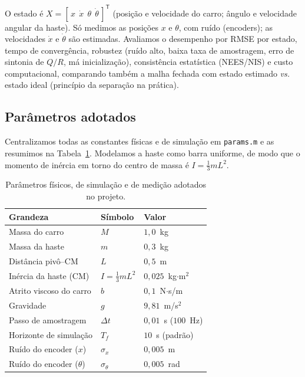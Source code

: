 \documentclass[brazil, 12pt]{article}
\begin{document}
O estado é
$X = [\,x\ \ \dot{x}\ \ \theta\ \ \dot{\theta}\,]^{\mathsf T}$ (posição e
velocidade do carro; ângulo e velocidade angular da haste). Só medimos as
posições $x$ e $\theta$, com ruído (encoders); as velocidades $\dot{x}$ e
$\dot{\theta}$ são estimadas. Avaliamos o desempenho por RMSE por estado, tempo
de convergência, robustez (ruído alto, baixa taxa de amostragem, erro de
sintonia de $Q/R$, má inicialização), consistência estatística (NEES/NIS) e
custo computacional, comparando também a malha fechada com estado estimado
\emph{vs.} estado ideal (princípio da separação na prática).

\subsection{Parâmetros adotados}

Centralizamos todas as constantes físicas e de simulação em \texttt{params.m}
e as resumimos na Tabela~\ref{tab:params}. Modelamos a haste como barra
uniforme, de modo que o momento de inércia em torno do centro de massa é
$I = \tfrac{1}{3}mL^{2}$.

\begin{table}[H]
\centering
\begin{tabular}{l l l}
\hline
\textbf{Grandeza} & \textbf{Símbolo} & \textbf{Valor} \\
\hline
Massa do carro          & $M$            & $1{,}0$~kg \\
Massa da haste          & $m$            & $0{,}3$~kg \\
Distância pivô--CM       & $L$            & $0{,}5$~m \\
Inércia da haste (CM)   & $I=\tfrac{1}{3}mL^{2}$ & $0{,}025$~kg$\cdot$m$^{2}$ \\
Atrito viscoso do carro & $b$            & $0{,}1$~N$\cdot$s/m \\
Gravidade               & $g$            & $9{,}81$~m/s$^{2}$ \\
\hline
Passo de amostragem     & $\Delta t$     & $0{,}01$~s ($100$~Hz) \\
Horizonte de simulação  & $T_f$          & $10$~s (padrão) \\
\hline
Ruído do encoder ($x$)  & $\sigma_x$     & $0{,}005$~m \\
Ruído do encoder ($\theta$) & $\sigma_\theta$ & $0{,}005$~rad \\
\hline
\end{tabular}
\caption{Parâmetros físicos, de simulação e de medição adotados no projeto.}
\label{tab:params}
\end{table}
\end{document}
